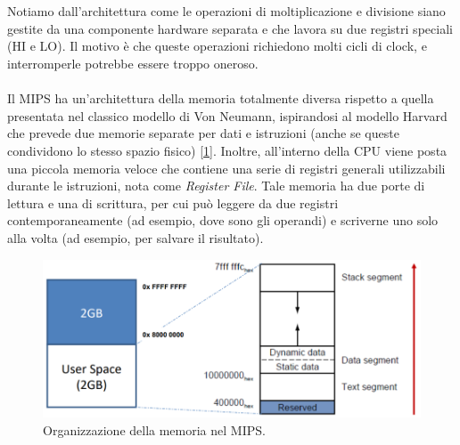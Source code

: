 \\
\\
Notiamo dall'architettura come le operazioni di moltiplicazione e divisione siano gestite da una componente hardware separata e che lavora su due registri speciali (HI e LO). Il motivo è che queste operazioni richiedono molti cicli di clock, e interromperle potrebbe essere troppo oneroso.
\\
\\
Il MIPS ha un'architettura della memoria totalmente diversa rispetto a quella presentata nel classico modello di Von Neumann, ispirandosi al modello Harvard che prevede due memorie separate per dati e istruzioni (anche se queste condividono lo stesso spazio fisico) [\ref{fig:mem-mips}]. Inoltre, all'interno della CPU viene posta una piccola memoria veloce che contiene una serie di registri generali utilizzabili durante le istruzioni, nota come \textit{Register File}. Tale memoria ha due porte di lettura e una di scrittura, per cui può leggere da due registri contemporaneamente (ad esempio, dove sono gli operandi) e scriverne uno solo alla volta (ad esempio, per salvare il risultato).
\begin{figure}[!h]
	\centering
	\includegraphics[width=0.5\linewidth]{img/mem-mips}
	\caption{Organizzazione della memoria nel MIPS.}
	\label{fig:mem-mips}
\end{figure}

